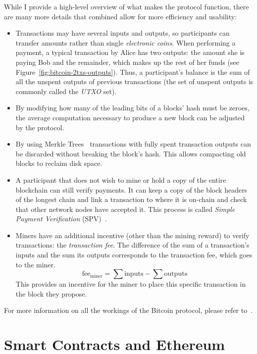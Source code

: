 While I provide a high-level overview of what makes the protocol function, there are many more details that combined
allow for more efficiency and usability:
\begin{itemize}
    \item Transactions may have several inputs and outputs, so participants can transfer amounts rather than single
    \textit{electronic coins}.
    When performing a payment, a typical transaction by Alice has two outputs: the amount she is paying Bob and the
    remainder, which makes up the rest of her funds (see Figure~\ref{fig:bitcoin-2txs-outputs}).
    Thus, a participant's balance is the sum of all the unspent outputs of previous transactions (the set of unspent
    outputs is commonly called the \textit{UTXO} set).
    \item By modifying how many of the leading bits of a blocks' hash must be zeroes, the average computation necessary
    to produce a new block can be adjusted by the protocol.
    \item By using Merkle Trees~\cite{merkle1980tree} transactions with fully spent transaction outputs can be discarded
    without breaking the block's hash.
    This allows compacting old blocks to reclaim disk space.
    \item A participant that does not wish to mine or hold a copy of the entire blockchain can still verify payments.
    It can keep a copy of the block headers of the longest chain and link a transaction to where it is on-chain and
    check that other network nodes have accepted it.
    This process is called \textit{Simple Payment Verification} (SPV)~\cite{nakamoto2008bitcoin}.
    \item Miners have an additional incentive (other than the mining reward) to verify transactions: the
    \textit{transaction fee}.
    The difference of the sum of a transaction's inputs and the sum its outputs corresponds to the transaction fee, which
    goes to the miner.
    \[
        \text{fee}_\text{miner} = \sum{\text{inputs}} - \sum{\text{outputs}}
    \]
    This provides an incentive for the miner to place this specific transaction in the block they propose.
\end{itemize}

For more information on all the workings of the Bitcoin protocol, please refer to~\cite{nakamoto2008bitcoin}.


\section{Smart Contracts and Ethereum}\label{sec:ethereum}

